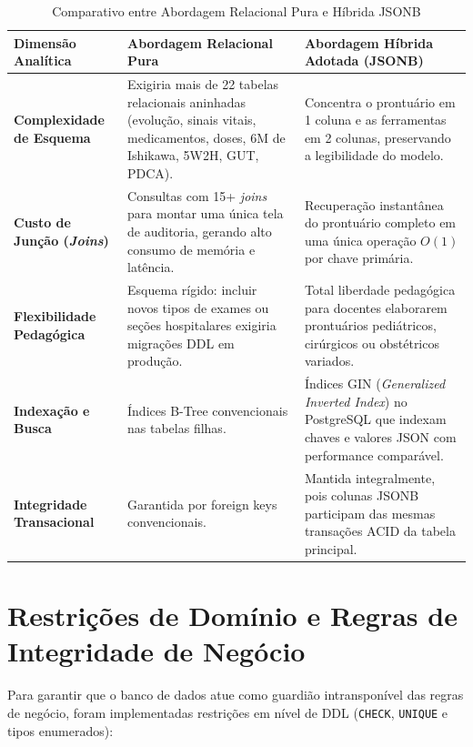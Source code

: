 \begin{table}[!ht]
\centering
\caption{Comparativo entre Abordagem Relacional Pura e Híbrida JSONB}
\label{tab_comparativo_jsonb}
\small
\begin{tabularx}{\textwidth}{p{3.2cm}X X}
\toprule
\textbf{Dimensão Analítica} & \textbf{Abordagem Relacional Pura} & \textbf{Abordagem Híbrida Adotada (JSONB)} \\
\midrule
\textbf{Complexidade de Esquema} & Exigiria mais de 22 tabelas relacionais aninhadas (evolução, sinais vitais, medicamentos, doses, 6M de Ishikawa, 5W2H, GUT, PDCA). & Concentra o prontuário em 1 coluna e as ferramentas em 2 colunas, preservando a legibilidade do modelo. \\
\addlinespace
\textbf{Custo de Junção (\textit{Joins})} & Consultas com 15+ \textit{joins} para montar uma única tela de auditoria, gerando alto consumo de memória e latência. & Recuperação instantânea do prontuário completo em uma única operação $O(1)$ por chave primária. \\
\addlinespace
\textbf{Flexibilidade Pedagógica} & Esquema rígido: incluir novos tipos de exames ou seções hospitalares exigiria migrações DDL em produção. & Total liberdade pedagógica para docentes elaborarem prontuários pediátricos, cirúrgicos ou obstétricos variados. \\
\addlinespace
\textbf{Indexação e Busca} & Índices B-Tree convencionais nas tabelas filhas. & Índices GIN (\textit{Generalized Inverted Index}) no PostgreSQL que indexam chaves e valores JSON com performance comparável. \\
\addlinespace
\textbf{Integridade Transacional} & Garantida por foreign keys convencionais. & Mantida integralmente, pois colunas JSONB participam das mesmas transações ACID da tabela principal. \\
\bottomrule
\end{tabularx}
\end{table}

\section{Restrições de Domínio e Regras de Integridade de Negócio}
\label{sec_restricoes_dominio}

Para garantir que o banco de dados atue como guardião intransponível das regras de negócio, foram implementadas restrições em nível de DDL (\texttt{CHECK}, \texttt{UNIQUE} e tipos enumerados):

